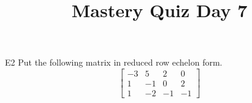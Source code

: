 \documentclass{sbgLAquiz}
\title{Mastery Quiz Day 7 }
\begin{document}
\begin{problem}{E2}
Put the following matrix in reduced row echelon form.
$$\begin{bmatrix}-3 & 5 & 2 & 0 \\ 1 & -1 & 0 & 2 \\ 1 & -2 & -1 & -1 \end{bmatrix}$$
\end{problem}
\end{document}
